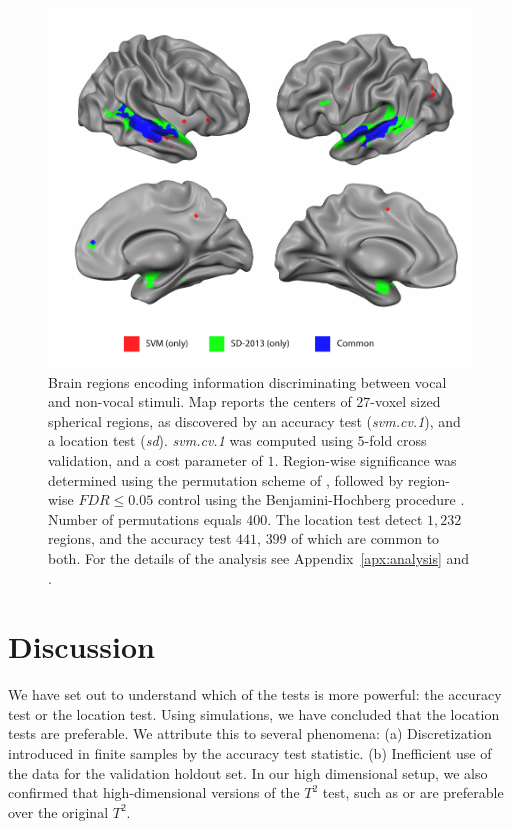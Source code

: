 \documentclass[12pt,a4paper]{article}
\begin{document}
\begin{figure}[th]
\centering
\includegraphics[width=0.7\linewidth]{"art/svm_vs_SD"}
\caption{\footnotesize
Brain regions encoding information discriminating between vocal and non-vocal stimuli.
Map reports the centers of $27$-voxel sized spherical regions, as discovered by an accuracy test (\emph{svm.cv.1}), and a location test (\emph{sd}). 
\emph{svm.cv.1} was computed using $5$-fold cross validation, and a cost parameter of $1$. 
Region-wise significance was determined using the permutation scheme of \cite{stelzer_statistical_2013}, followed by region-wise $FDR \leq 0.05$ control using the Benjamini-Hochberg procedure \citep{benjamini_controlling_1995}.
Number of permutations equals $400$.
The location test detect $1,232$ regions, and the accuracy test $441$, $399$ of which are common to both.
For the details of the analysis see Appendix~\ref{apx:analysis} and \cite{gilron_quantifying_2016}.  
  }
\label{fig:read_data}
\end{figure}








\section{Discussion}
\label{sec:discussion}


We have set out to understand which of the tests is more powerful: the accuracy test or the location test. 
Using simulations, we have concluded that the location tests are preferable. 
We attribute this to several phenomena: 
(a) Discretization introduced in finite samples by the accuracy test statistic. 
(b) Inefficient use of the data for the validation holdout set. 
In our high dimensional setup, we also confirmed that high-dimensional versions of the $T^2$ test, such as \cite{srivastava_testing_2013} or \cite{schafer_shrinkage_2005} are preferable over the original $T^2$. 
\end{document}
